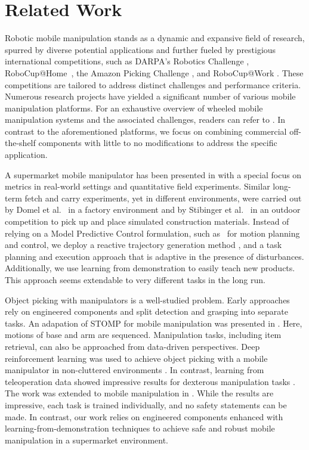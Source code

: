 \section{Related Work}

Robotic mobile manipulation stands as a dynamic and expansive field of research,
spurred by diverse potential applications and further fueled by prestigious
international competitions, such as DARPA’s Robotics Challenge
\cite{darpa_challenge}, RoboCup@Home~\cite{robocup_home}, the Amazon Picking
Challenge \cite{corbato2018integrating}, and RoboCup@Work \cite{robocup_work}.
These competitions are tailored to address distinct challenges and performance
criteria. Numerous research projects have yielded a significant number of
various mobile manipulation platforms. For an exhaustive overview of wheeled
mobile manipulation systems and the associated challenges, readers can refer to
\cite{overview1,overview2}.
In contrast to the aforementioned platforms, we focus on combining commercial off-the-shelf components with
little to no modifications to address the specific application.

A supermarket mobile manipulator has been presented in
\cite{toyota2023} with a special focus on metrics in real-world settings and quantitative field experiments. Similar long-term fetch and carry
experiments, yet in different environments, were carried out by Domel et
al.~\cite{domel2017toward} in a factory environment and by Stibinger et
al.~\cite{vstibinger2021mobile} in an outdoor competition to pick up and place
simulated construction materials. Instead of relying on a  Model Predictive
Control formulation, such as~\cite{minniti2021model} for motion
planning and control, we deploy a reactive trajectory generation method
\cite{ratliff2023fabrics}, and a task planning and execution approach that is
 adaptive in the presence of disturbances.
Additionally, we use learning from demonstration to easily teach new products. This approach seems extendable to very different tasks
in the long run.


Object picking with manipulators
is a well-studied problem. Early approaches rely on engineered components and
split detection and grasping into separate tasks. An adapation of STOMP
\cite{Kalakrishnan2011} for mobile manipulation was presented in
\cite{bormann2019towards}. Here, motions of base and arm are sequenced.
Manipulation tasks, including item retrieval, can also be approached from
data-driven perspectives. Deep reinforcement learning was used to achieve object
picking with a mobile manipulator in non-cluttered environments
\cite{wang2020learning}. In contrast, learning from teleoperation data showed
impressive results for dexterous manipulation tasks \cite{zhao2023learning}. The
work was extended to mobile manipulation in \cite{fu2024mobile}. While the
results are impressive, each task is trained individually, and no safety
statements can be made. In contrast, our work relies on engineered components
enhanced with learning-from-demonstration techniques to achieve safe and robust
mobile manipulation in a supermarket environment.



